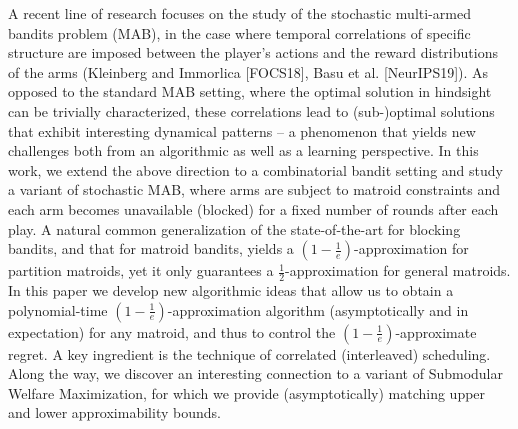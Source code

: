 A recent line of research focuses on the study of the stochastic multi-armed bandits problem (MAB), in the case where temporal correlations of specific structure are imposed between the player's actions and the reward distributions of the arms (Kleinberg and Immorlica [FOCS18], Basu et al. [NeurIPS19]). As opposed to the standard MAB setting, where the optimal solution in hindsight can be trivially characterized, these correlations lead to (sub-)optimal solutions that exhibit interesting dynamical patterns -- a phenomenon that yields new challenges both from an algorithmic as well as a learning perspective. In this work, we extend the above direction to a combinatorial bandit setting and study a variant of stochastic MAB, where arms are subject to matroid constraints and each arm becomes unavailable (blocked) for a fixed number of rounds after each play. A natural common generalization of the state-of-the-art for blocking bandits, and that for matroid bandits, yields a $(1-\frac{1}{e})$-approximation for partition matroids, yet it only guarantees a $\frac{1}{2}$-approximation for general matroids. In this paper we develop new algorithmic ideas that allow us to obtain a polynomial-time $(1 - \frac{1}{e})$-approximation algorithm (asymptotically and in expectation) for any matroid, and thus to control the $(1-\frac{1}{e})$-approximate regret. A key ingredient is the technique of correlated (interleaved) scheduling. Along the way, we discover an interesting connection to a variant of Submodular Welfare Maximization, for which we provide (asymptotically) matching upper and lower approximability bounds.

